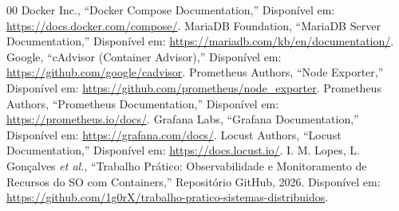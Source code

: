 \documentclass[conference]{IEEEtran}
\begin{document}
\begin{thebibliography}{00}
 Docker Inc., ``Docker Compose Documentation,'' Disponível em: \url{https://docs.docker.com/compose/}.
 MariaDB Foundation, ``MariaDB Server Documentation,'' Disponível em: \url{https://mariadb.com/kb/en/documentation/}.
 Google, ``cAdvisor (Container Advisor),'' Disponível em: \url{https://github.com/google/cadvisor}.
 Prometheus Authors, ``Node Exporter,'' Disponível em: \url{https://github.com/prometheus/node_exporter}.
 Prometheus Authors, ``Prometheus Documentation,'' Disponível em: \url{https://prometheus.io/docs/}.
 Grafana Labs, ``Grafana Documentation,'' Disponível em: \url{https://grafana.com/docs/}.
 Locust Authors, ``Locust Documentation,'' Disponível em: \url{https://docs.locust.io/}.
 I. M. Lopes, L. Gonçalves \textit{et al.}, ``Trabalho Prático: Observabilidade e Monitoramento de Recursos do SO com Containers,'' Repositório GitHub, 2026. Disponível em: \url{https://github.com/1g0rX/trabalho-pratico-sistemas-distribuidos}.
\end{thebibliography}
\end{document}
